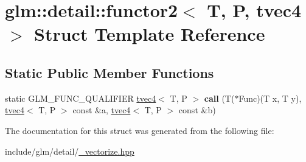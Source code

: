 \hypertarget{structglm_1_1detail_1_1functor2_3_01T_00_01P_00_01tvec4_01_4}{}\section{glm\+:\+:detail\+:\+:functor2$<$ T, P, tvec4 $>$ Struct Template Reference}
\label{structglm_1_1detail_1_1functor2_3_01T_00_01P_00_01tvec4_01_4}
\subsection*{Static Public Member Functions}
\begin{DoxyCompactItemize}
\item 
\mbox{\label{structglm_1_1detail_1_1functor2_3_01T_00_01P_00_01tvec4_01_4_a27fb8a00559c0caa02b7e5892301922f}} 
static G\+L\+M\+\_\+\+F\+U\+N\+C\+\_\+\+Q\+U\+A\+L\+I\+F\+I\+ER \hyperlink{structglm_1_1tvec4}{tvec4}$<$ T, P $>$ {\bfseries call} (T($\ast$Func)(T x, T y), \hyperlink{structglm_1_1tvec4}{tvec4}$<$ T, P $>$ const \&a, \hyperlink{structglm_1_1tvec4}{tvec4}$<$ T, P $>$ const \&b)
\end{DoxyCompactItemize}


The documentation for this struct was generated from the following file\+:\begin{DoxyCompactItemize}
\item 
include/glm/detail/\hyperlink{__vectorize_8hpp}{\+\_\+vectorize.\+hpp}\end{DoxyCompactItemize}
